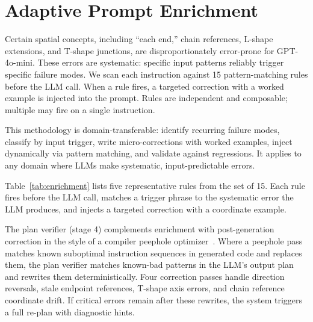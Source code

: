 \documentclass{article}
\begin{document}
\section{Adaptive Prompt Enrichment}

Certain spatial concepts, including ``each end,'' chain references,
L-shape extensions, and T-shape junctions, are disproportionately
error-prone for GPT-4o-mini. These errors are systematic: specific input
patterns reliably trigger specific failure modes. We scan each instruction
against 15 pattern-matching rules before the LLM call. When a rule fires,
a targeted correction with a worked example is injected into the prompt.
Rules are independent and composable; multiple may fire on a single
instruction.

This methodology is domain-transferable: identify recurring failure
modes, classify by input trigger, write micro-corrections with worked
examples, inject dynamically via pattern matching, and validate against
regressions. It applies to any domain where LLMs make systematic,
input-predictable errors.

Table~\ref{tab:enrichment} lists five representative rules from the set of
15. Each rule fires before the LLM call, matches a trigger phrase to
the systematic error the LLM produces, and injects a targeted correction
with a coordinate example.

The plan verifier (stage 4) complements enrichment with post-generation
correction in the style of a compiler peephole
optimizer~\cite{mckeeman1965}. Where a peephole pass matches known
suboptimal instruction sequences in generated code and replaces them,
the plan verifier matches known-bad patterns in the LLM's output plan
and rewrites them deterministically. Four correction passes handle
direction reversals, stale endpoint references, T-shape axis errors,
and chain reference coordinate drift. If critical errors remain after
these rewrites, the system triggers a full re-plan with diagnostic hints.
\end{document}
